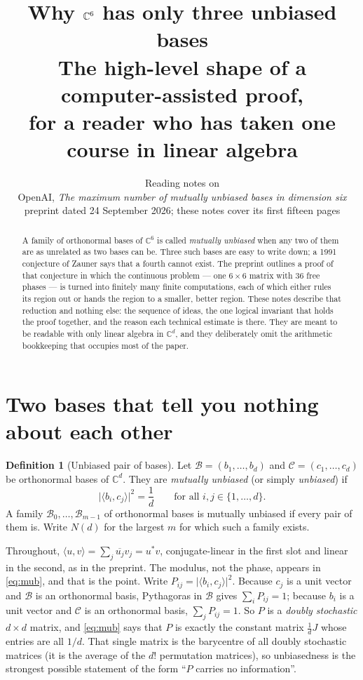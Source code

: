 \documentclass[11pt]{article}
\title{\bfseries Why $\C^6$ has only three unbiased bases\\[4pt]
\large The high-level shape of a computer-assisted proof,\\ for a reader who has taken one course in linear algebra}
\author{Reading notes on\\[2pt]
OpenAI, \emph{The maximum number of mutually unbiased bases in dimension six}\\[2pt]
{\small preprint dated 24 September 2026; these notes cover its first fifteen pages}}
\date{}
\theoremstyle{definition}
\newtheorem{definition}{Definition}[section]
\theoremstyle{plain}
\theoremstyle{definition}
\newcommand{\C}{\mathbb{C}}
\newcommand{\inner}[2]{\langle #1,#2\rangle}
\newcommand{\abs}[1]{\lvert #1\rvert}
\begin{document}
\maketitle

\begin{abstract}
\noindent
A family of orthonormal bases of $\C^6$ is called \emph{mutually unbiased} when any two of them
are as unrelated as two bases can be. Three such bases are easy to write down; a 1991 conjecture
of Zauner says that a fourth cannot exist. The preprint outlines a proof of that conjecture in
which the continuous problem --- one $6\times6$ matrix with $36$ free phases --- is turned into
finitely many finite computations, each of which either rules its region out or hands the region
to a smaller, better region. These notes describe that reduction and nothing else: the sequence
of ideas, the one logical invariant that holds the proof together, and the reason each technical
estimate is there. They are meant to be readable with only linear algebra in $\C^d$, and they
deliberately omit the arithmetic bookkeeping that occupies most of the paper.
\end{abstract}

\tableofcontents

\bigskip

\section{Two bases that tell you nothing about each other}

\begin{definition}[Unbiased pair of bases]\label{def:mub}
Let $\mathcal B=(b_1,\dots,b_d)$ and $\mathcal C=(c_1,\dots,c_d)$ be orthonormal bases of $\C^d$.
They are \emph{mutually unbiased} (or simply \emph{unbiased}) if
\begin{equation}\label{eq:mub}
\abs{\inner{b_i}{c_j}}^2=\frac1d
\qquad\text{for all } i,j\in\{1,\dots,d\}.
\end{equation}
A family $\mathcal B_0,\dots,\mathcal B_{m-1}$ of orthonormal bases is mutually unbiased if every
pair of them is. Write $N(d)$ for the largest $m$ for which such a family exists.
\end{definition}

Throughout, $\inner{u}{v}=\sum_j\overline{u_j}v_j=u^*v$, conjugate-linear in the first slot and linear
in the second, as in the preprint. The modulus, not the phase, appears in \eqref{eq:mub}, and that is
the point. Write $P_{ij}=\abs{\inner{b_i}{c_j}}^2$.
Because $c_j$ is a unit vector and $\mathcal B$ is an orthonormal basis, Pythagoras in $\mathcal B$ gives
$\sum_i P_{ij}=1$; because $b_i$ is a unit vector and $\mathcal C$ is an orthonormal basis,
$\sum_j P_{ij}=1$. So $P$ is a \emph{doubly stochastic} $d\times d$ matrix, and
\eqref{eq:mub} says that $P$ is exactly the constant matrix $\frac1d J$ whose entries are all $1/d$.
That single matrix is the barycentre of all doubly stochastic matrices (it is the average of the
$d!$ permutation matrices), so unbiasedness is the strongest possible statement of the form
``$P$ carries no information''.
\end{document}
